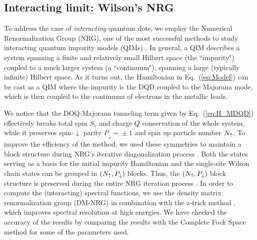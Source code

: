 \documentclass[showpacs,aps,prb,reprint,superscriptaddress]{revtex4-2}
\begin{document}



\subsection{Interacting limit: Wilson's NRG }
\label{sec:NRG-interacting}


To address the case of \textit{interacting} quantum dots, we employ the Numerical Renormalization Group (NRG), one of the most successful methods to study interacting quantum impurity models (QIMs)  \cite{wilson_renormalization_1975,sindel_numerical_2005,bulla_numerical_2008}. In general, a QIM describes a system spanning a finite and relatively small Hilbert space (the ``impurity") coupled to a much larger system (a ``continuum"), spanning a large (typically infinite) Hilbert space. As it turns out, the Hamiltonian in Eq.\ (\ref{eq:Model}) can be cast as a QIM where the impurity is the DQD coupled to the Majorana mode, which is then coupled to the continuum of electrons in the metallic leads.

We notice that the DOQ-Majorana tunneling term given by Eq.\ (\ref{eq:H_MDQD}) effectively breaks total spin $S_z$ and charge $Q$ conservation of the whole system, while it preserves spin-$\downarrow$ parity $P_{\downarrow}\!=\! \pm 1$ and spin up particle number $N_\uparrow$. To  improve the efficiency of the method, we used these symmetries to maintain a block structure during NRG's iterative diagonalization process  \cite{bulla_numerical_2008,lee_kondo_2013,ruiz-tijerina_interaction_2015}. 
Both the states serving as a basis for the initial impurity Hamiltonian and the single-site Wilson chain states can be grouped in $(N_\uparrow,P_\downarrow)$ blocks. Thus, the $(N_\uparrow,P_\downarrow)$ block structure is preserved during the entire NRG iteration process \cite{bulla_numerical_2008}. In order to compute the (interacting) spectral functions, we use the density matrix renormalization group (DM-NRG) \cite{hofstetter_generalized_2000} in combination with the z-trick method \cite{oliveira_generalized_1994}, which improves spectral resolution at high energies. We have checked the accuracy of the results by comparing the results with the Complete Fock Space method \cite{Peters:Phys.Rev.B:245114:2006} for some of the parameters used.
\end{document}
